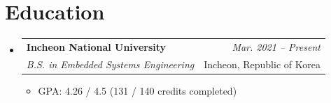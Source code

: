 \documentclass[a4paper,11pt]{article}
\makeatletter
\newcommand{\resumeSubheading}[4]{%
\item
    \begin{tabular*}{0.98\textwidth}[t]{l@{\extracolsep{\fill}}r}
        \textbf{#1} & \textit{\footnotesize{#4}} \\
        \textit{\footnotesize{#3}} & \footnotesize{#2}\\
    \end{tabular*}
}
\newcommand{\resumeSubHeadingListStart}{\begin{itemize}}
\newcommand{\resumeItemListStart}{\begin{itemize}}
\newcommand{\resumeSubHeadingListEnd}{\end{itemize}}
\newcommand{\resumeItemListEnd}{\end{itemize}}
\makeatother
\begin{document}
\section{\textbf{Education}}
\resumeSubHeadingListStart

  \resumeSubheading
  {Incheon National University}{Incheon, Republic of Korea}
  {B.S. in Embedded Systems Engineering}{Mar. 2021 -- Present}
  \resumeItemListStart
    \item GPA: 4.26 / 4.5 \hfill (131 / 140 credits completed)
  \resumeItemListEnd

\resumeSubHeadingListEnd

\end{document}
